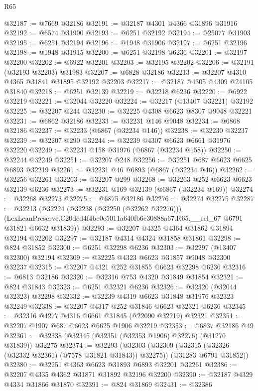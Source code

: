 \begin{lexlean}{R65}
\begin{coremodule}
{@32187 := @7669 @32186
@32191 := @32187 @4301 @4366 @31896 @31916
@32192 := @6574 @31900
@32193 := @6251 @32192
@32194 := @25077 @31903
@32195 := @6251 @32194
@32196 := @1948 @31906
@32197 := @6251 @32196
@32198 := @1948 @31915
@32200 := @6251 @32198 @6236
@32201 := @32197 @32200
@32202 := @6922 @32201
@32203 := @32195 @32202
@32206 := @32191 (@32193 @32203) @31983
@32207 := @6828 @32186
@32213 := @32207 @4310 @4365 @31841 @31895 @32192 @32203
@32217 := @32187 @4305 @4309 @24105 @31840
@32218 := @6251 @32139
@32219 := @32218 @6236
@32220 := @6922 @32219
@32221 := @32044 @32220
@32224 := @32217 (@13407 @32221) @32192
@32225 := @32207 @244
@32230 := @32225 @4308 @6623 @8307 @9048 @32221
@32231 := @6862 @32186
@32233 := @32231 @146 @9048
@32234 := @6868 @32186
@32237 := @32233 (@6867 (@32234 @146))
@32238 := @32230 @32237
@32239 := @32207 @290
@32244 := @32239 @4307 @6623 @6661 @31976 @32220
@32249 := @32231 @158 @31976 (@6867 (@32234 @158))
@32250 := @32244 @32249
@32251 := @32207 @248
@32256 := @32251 @687 @6623 @6625 @6893 @32219
@32261 := @32231 @46 @6893 (@6867 (@32234 @46))
@32262 := @32256 @32261
@32263 := @32207 @299
@32268 := @32263 @252 @6623 @6623 @32139 @6236
@32273 := @32231 @169 @32139 (@6867 (@32234 @169))
@32274 := @32268 @32273
@32275 := @6875 @32186
@32276 := @32274 @32275
@32287 := @32213
    (@32224
      (@32238 (@32250 (@32262 @32276)))
      (LexLeanPreserve.C20ded4f4be0e5011a640fb6c30888a67.R65.__rel_67 @6791 @31821 @6632 @31839))
@32293 := @32207 @4325 @4364 @31862 @31894 @32194 @32202
@32297 := @32187 @4314 @4324 @31858 @31861
@32298 := @824 @31852
@32300 := @6251 @32298 @6236
@32303 := @32297 (@13407 @32300) @32194
@32309 := @32225 @4323 @6623 @31857 @9048 @32300 @32237
@32315 := @32207 @4321 @252 @31855 @6623 @32298 @6236
@32316 := @6813 @32186
@32320 := @32316 @753 @4320 @31849 @31854
@32321 := @824 @31843
@32323 := @6251 @32321 @6236
@32326 := @32320 (@32044 @32323) @32298
@32332 := @32239 @4319 @6623 @31848 @31976 @32323 @32249
@32338 := @32207 @4317 @252 @31846 @6623 @32321 @6236
@32345 := @32316 @4277 @4316 @6661 @31845 (@22090 @32219) @32321
@32351 := @32207 @1907 @687 @6623 @6625 @1906 @32219
@32353 := @6837 @32186 @49
@32361 := @32338 (@32345 (@32351 (@32353 @1906) @32276) (@31270 @31839)) @32275
@32374 := @32293
    (@32303
      (@32309 (@32315 (@32326 (@32332 @32361) (@7578 @31821 @31843)) @32275))
      (@31283 @6791 @31852))
@32380 := @32251 @4363 @6623 @31893 @6893 @32201 @32261
@32386 := @32207 @4335 @4362 @31871 @31892 @32196 @32200
@32390 := @32187 @4329 @4334 @31866 @31870
@32391 := @824 @31869
@32431 := @32386
}
\end{coremodule}
\end{lexlean}
